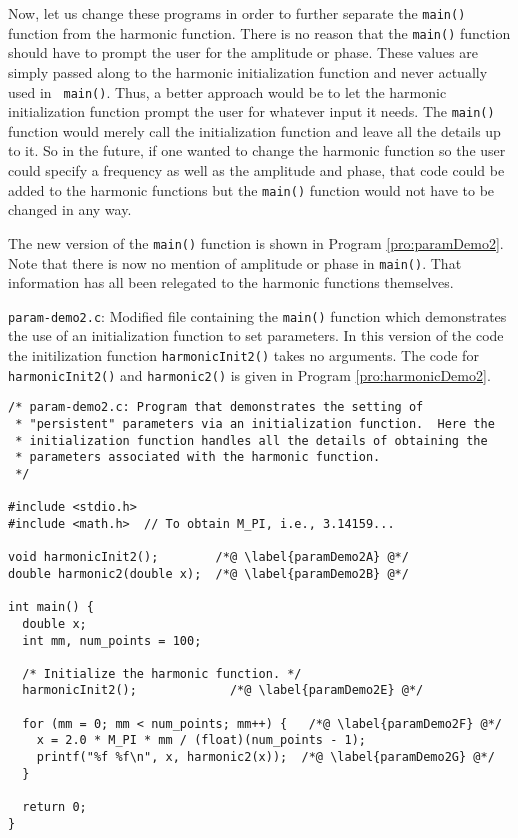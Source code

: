Now, let us change these programs in order to further separate the
{\tt main()} function from the harmonic function.  There is no reason
that the {\tt main()} function should have to prompt the user for the
amplitude or phase.  These values are simply passed along to the
harmonic initialization function and never actually used in {\tt
  main()}.  Thus, a better approach would be to let the harmonic
initialization function prompt the user for whatever input it needs.
The {\tt main()} function would merely call the initialization
function and leave all the details up to it.  So in the future, if one
wanted to change the harmonic function so the user could specify a
frequency as well as the amplitude and phase, that code could be added
to the harmonic functions but the {\tt main()} function would not have
to be changed in any way.

The new version of the {\tt main()} function is shown in Program
\ref{pro:paramDemo2}.  Note that there is now no mention of amplitude
or phase in {\tt main()}.  That information has all been relegated to
the harmonic functions themselves.

\begin{program}
  {\tt param-demo2.c}: Modified file containing the {\tt main()}
  function which demonstrates the use of an initialization function to
  set parameters.  In this version of the code the initilization
  function {\tt harmonicInit2()} takes no arguments.  The code for
  {\tt harmonicInit2()} and {\tt harmonic2()} is given in Program
  \ref{pro:harmonicDemo2}.
\label{pro:paramDemo2}
\codemiddle
\begin{lstlisting}
/* param-demo2.c: Program that demonstrates the setting of
 * "persistent" parameters via an initialization function.  Here the
 * initialization function handles all the details of obtaining the
 * parameters associated with the harmonic function.
 */

#include <stdio.h>
#include <math.h>  // To obtain M_PI, i.e., 3.14159...

void harmonicInit2();        /*@ \label{paramDemo2A} @*/
double harmonic2(double x);  /*@ \label{paramDemo2B} @*/

int main() {
  double x;
  int mm, num_points = 100;

  /* Initialize the harmonic function. */
  harmonicInit2();             /*@ \label{paramDemo2E} @*/

  for (mm = 0; mm < num_points; mm++) {   /*@ \label{paramDemo2F} @*/
    x = 2.0 * M_PI * mm / (float)(num_points - 1);
    printf("%f %f\n", x, harmonic2(x));  /*@ \label{paramDemo2G} @*/
  }

  return 0;
}
\end{lstlisting}
\end{program}

